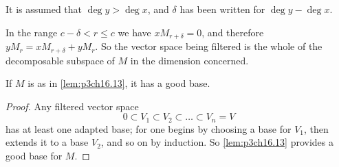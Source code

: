 \documentclass[../main]{subfiles}
\begin{document}
\begin{notes}
It is assumed that $\deg y > \deg x$, and $\delta$ has been written for $\deg y - \deg x$.
\end{notes}

\begin{notes}
In the range $c - \delta < r \le c$ we have $x M_{r + \delta} = 0$, and therefore $y M_r = x M_{r + \delta} + y M_r$. So the vector space being filtered is the whole of the decomposable subspace of $M$ in the dimension concerned.
\end{notes}

\begin{corollary}
\label{cor:p3ch16.14}
If $M$ is as in \ref{lem:p3ch16.13}, it has a good base. 
\end{corollary}

\begin{proof}
Any filtered vector space \[0 \subset V_1 \subset V_2 \subset \ldots \subset V_n = V\] has at least one adapted base; for one begins by choosing a base for $V_1$, then extends it to a base $V_2$, and so on by induction. So \ref{lem:p3ch16.13} provides a good base for $M$.
\end{proof}
\end{document}
